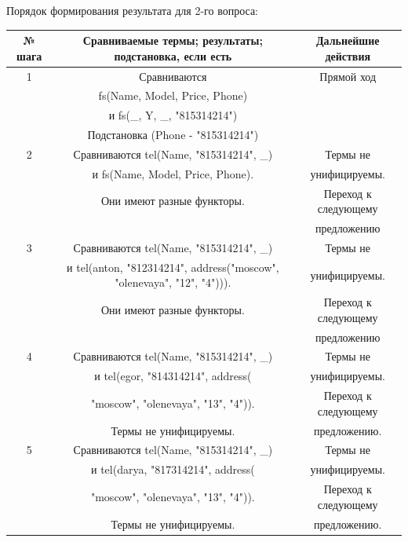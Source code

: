 \documentclass[12pt]{report}
\begin{document}
Порядок формирования результата для 2-го вопроса:

\begin{table}[H]
	\begin{center}
		\begin{tabular}{|c c c |} 
			\hline
			№ шага & Сравниваемые термы; результаты; подстановка, если есть & Дальнейшие действия \\  
			\hline
			1 & Сравниваются & Прямой ход \\
			  & fs(Name, Model, Price, Phone) & \\
			  & и fs(_, Y, _, "815314214")  & \\
			  & Подстановка (Phone - "815314214") &\\
			\hline
			2 & Сравниваются tel(Name, "815314214", \_) & Термы не \\
			  & и fs(Name, Model, Price, Phone). & унифицируемы. \\
			  & Они имеют разные функторы. &Переход к следующему \\
			  & & предложению\\
			\hline
			3 & Сравниваются tel(Name, "815314214", \_) & Термы не \\
			  & и tel(anton, "812314214", address("moscow", "olenevaya", "12", "4"))). & унифицируемы. \\
			  & Они имеют разные функторы. & Переход к следующему \\
			  & & предложению\\
			\hline
			4 & Сравниваются tel(Name, "815314214", \_) & Термы не \\
			  & и tel(egor, "814314214", address( & унифицируемы. \\
		      & "moscow", "olenevaya", "13", "4")).  & Переход к следующему \\
			  & Термы не унифицируемы. & предложению. \\
			\hline
			5 & Сравниваются tel(Name, "815314214", \_) & Термы не \\
			  & и tel(darya, "817314214", address( & унифицируемы. \\
		      & "moscow", "olenevaya", "13", "4")).  & Переход к следующему \\
			  & Термы не унифицируемы. & предложению. \\
			\hline
        \end{tabular}
        	\end{center}
        \end{table}
\end{document}

